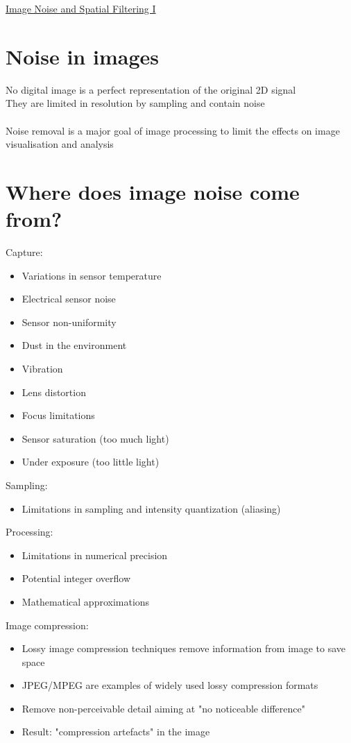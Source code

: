 \documentclass{article}[18pt]
\begin{document}
\begin{center}
\underline{\huge Image Noise and Spatial Filtering I}
\end{center}
\section{Noise in images}
No digital image is a perfect representation of the original 2D signal\\
They are limited in resolution by sampling and contain noise\\
\\
Noise removal is a major goal of image processing to limit the effects on image visualisation and analysis
\section{Where does image noise come from?}
Capture:
\begin{itemize}
	\item Variations in sensor temperature
	\item Electrical sensor noise
	\item Sensor non-uniformity
	\item Dust in the environment
	\item Vibration
	\item Lens distortion
	\item Focus limitations
	\item Sensor saturation (too much light)
	\item Under exposure (too little light)
\end{itemize}
Sampling:
\begin{itemize}
	\item Limitations in sampling and intensity quantization (aliasing)
\end{itemize}
Processing:
\begin{itemize}
	\item Limitations in numerical precision
	\item Potential integer overflow
	\item Mathematical approximations
\end{itemize}
Image compression:
\begin{itemize}
	\item Lossy image compression techniques remove information from image to save space
	\item JPEG/MPEG are examples of widely used lossy compression formats
	\item Remove non-perceivable detail aiming at "no noticeable difference"
	\item Result: "compression artefacts" in the image
\end{itemize}
\end{document}
